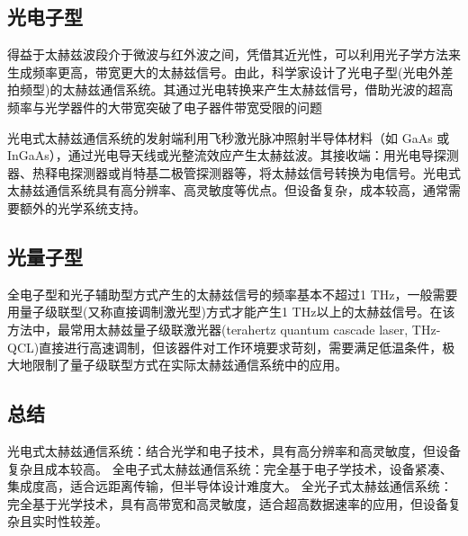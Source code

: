 \subsection{光电子型}

得益于太赫兹波段介于微波与红外波之间，凭借其近光性，可以利用光子学方法来生成频率更高，带宽更大的太赫兹信号。由此，科学家设计了光电子型(光电外差拍频型)的太赫兹通信系统。其通过光电转换来产生太赫兹信号，借助光波的超高频率与光学器件的大带宽突破了电子器件带宽受限的问题

光电式太赫兹通信系统的发射端利用飞秒激光脉冲照射半导体材料（如 GaAs 或 InGaAs），通过光电导天线或光整流效应产生太赫兹波。其接收端：用光电导探测器、热释电探测器或肖特基二极管探测器等，将太赫兹信号转换为电信号。光电式太赫兹通信系统具有高分辨率、高灵敏度等优点。但设备复杂，成本较高，通常需要额外的光学系统支持。


\subsection{光量子型}
全电子型和光子辅助型方式产生的太赫兹信号的频率基本不超过1 THz，一般需要用量子级联型(又称直接调制激光型)方式才能产生1 THz以上的太赫兹信号。在该方法中，最常用太赫兹量子级联激光器(terahertz quantum cascade laser, THz-QCL)直接进行高速调制，但该器件对工作环境要求苛刻，需要满足低温条件，极大地限制了量子级联型方式在实际太赫兹通信系统中的应用。

\subsection{总结}
光电式太赫兹通信系统：结合光学和电子技术，具有高分辨率和高灵敏度，但设备复杂且成本较高。
全电子式太赫兹通信系统：完全基于电子学技术，设备紧凑、集成度高，适合远距离传输，但半导体设计难度大。
全光子式太赫兹通信系统：完全基于光学技术，具有高带宽和高灵敏度，适合超高数据速率的应用，但设备复杂且实时性较差。
\begin{table}[htbp]
	\centering
	\caption{太赫兹通信系统分类与对比}
	\label{tab:terahertz_systems}
\end{table}
